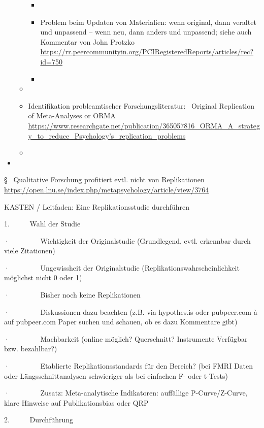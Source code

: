 \documentclass[
  letterpaper,
  DIV=11,
  numbers=noendperiod]{scrreprt}
\begin{document}
\begin{itemize}
\begin{itemize}
    \begin{itemize}
    \item
    \item
      Problem beim Updaten von Materialien: wenn original, dann veraltet
      und unpassend -- wenn neu, dann anders und unpassend; siehe auch
      Kommentar von John Protzko
      \url{https://rr.peercommunityin.org/PCIRegisteredReports/articles/rec?id=750}
    \item
    \end{itemize}
  \item
  \item
    Identifikation probleamtischer Forschungsliteratur: ~Original
    Replication of Meta-Analyses or ORMA
    \href{https://www.researchgate.net/publication/365057816_ORMA_A_strategy_to_reduce_Psychology's_replication_problems}{https://www.researchgate.net/publication/365057816\_ORMA\_A\_strategy\_to\_reduce\_Psychology's\_replication\_problems}
  \item
  \end{itemize}
\item
\end{itemize}

§~ Qualitative Forschung profitiert evtl. nicht von Replikationen
\url{https://open.lnu.se/index.php/metapsychology/article/view/3764}

KASTEN / Leitfaden: Eine Replikationsstudie durchführen

1.~~~~~ Wahl der Studie

·~~~~~~~~ Wichtigkeit der Originalstudie (Grundlegend, evtl. erkennbar
durch viele Zitationen)

·~~~~~~~~ Ungewissheit der Originalstudie
(Replikationswahrscheinlichkeit möglichst nicht 0 oder 1)

·~~~~~~~~ Bisher noch keine Replikationen

·~~~~~~~~ Diskussionen dazu beachten (z.B. via hypothes.is oder
pubpeer.com à auf pubpeer.com Paper suchen und schauen, ob es dazu
Kommentare gibt)

·~~~~~~~~ Machbarkeit (online möglich? Querschnitt? Instrumente
Verfügbar bzw. bezahlbar?)

·~~~~~~~~ Etablierte Replikationsstandards für den Bereich? (bei FMRI
Daten oder Längsschnittanalysen schwieriger als bei einfachen F- oder
t-Tests)

·~~~~~~~~ Zusatz: Meta-analytische Indikatoren: auffällige
P-Curve/Z-Curve, klare Hinweise auf Publikationsbias oder QRP

2.~~~~~ Durchführung
\end{document}
